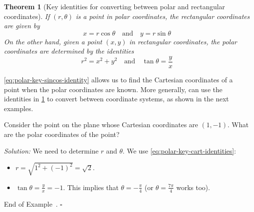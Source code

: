 \documentclass[10pt]{article}
\newtheorem{theorem}{Theorem}
\theoremstyle{definition}
\newtheorem{example}[theorem]{Example}
\renewenvironment{example}
{\begin{oldexample}}
  {\par\smallskip\hfill   End of Example~\theexample. $\square$    \par\end{oldexample}}
\newcommand{\Fli}{\vskip 2mm\noindent\textit} %
\newcommand{\1}[1]{\textbf{1}_{\left[#1\right]}} %
\begin{document}
\begin{theorem}[Key identities for converting between polar and rectangular coordinates]
  \label{thm:key-identities-for-converting-between-polar-and-rectangular-coordinates}
  If $(r,\theta)$ is a point in polar coordinates, the rectangular coordinates
  are given by
  \begin{equation}\label{eq:polar-key-sincos-identity}
    x = r\cos \theta \quad \text{and} \quad y = r\sin \theta
  \end{equation}
  On the other hand, given a point $(x,y)$ in rectangular coordinates, the polar
  coordinates are determined by the identities
  \begin{equation}\label{eq:polar-key-cart-identities}
    r^{2} = x^{2}+y^{2} \quad \text{and} \quad \tan \theta = \frac{y}{x}
  \end{equation}
\end{theorem}

\cref{eq:polar-key-sincos-identity} allows us to find the Cartesian coordinates
of a point when the polar coordinates are known. More generally, can use the
identities in
\cref{thm:key-identities-for-converting-between-polar-and-rectangular-coordinates}
to convert between coordinate systems, as shown in the next examples.

\begin{example}[Example 3 in Chapter 10.3]
  Consider the point on the plane whose Cartesian coordinates are $(1,-1)$. What
  are the polar coordinates of the point?


  \begin{center}
  \end{center}

  \Fli{Solution:} We need to determine $r$ and $\theta$. We use \cref{eq:polar-key-cart-identities}:
  \begin{itemize}
    \item $r = \sqrt{1^{2}+(-1)^{2}}=\sqrt{2}$. 
    \item $\tan\theta = \frac{y}{x} = -1$. This implies that
    $\theta=-\frac{\pi}{4}$ (or $\theta=\frac{7\pi}{4}$ works too).
  \end{itemize}
\end{example}
\end{document}
